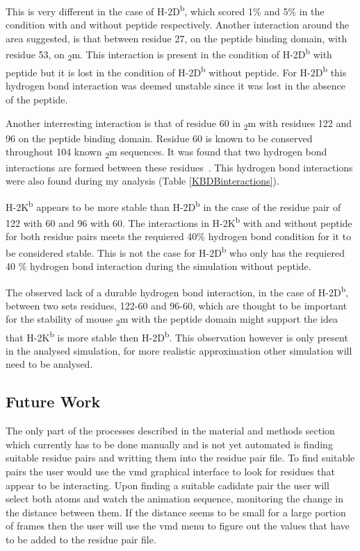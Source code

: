 \documentclass[11pt,twocolumn]{article}
\newcommand{\db}{H-2D\textsuperscript{b}\xspace}
\newcommand{\kb}{H-2K\textsuperscript{b}\xspace}
\newcommand{\btm}{\textbeta\textsubscript{2}m\xspace}
\begin{document}
This is very different in the case of \db, which scored 1\% and 5\% in the condition with and without peptide respectively. Another interaction around the area suggested, is that between  residue 27, on the peptide binding domain, with residue 53, on \btm. This interaction  is present in the condition of \db with peptide but it is lost in the condition of \db without peptide. For \db this hydrogen bond interaction was deemed unstable since it was lost in the absence of the peptide.  

Another interresting interaction is that of residue 60 in \btm with residues 122 and 96 on the peptide binding domain. Residue 60 is known to be conserved throughout 104 known \btm
sequences. It was found that two hydrogen bond interactions are formed between these residues~\cite{achour2006structural}. This hydrogen bond interactions were also found during my analysis (Table \ref{KBDBinteractions}). 

\kb appears to be more stable than \db in the case of the residue pair of 122 with 60 and 96 with 60. The  interactions in \kb with and without peptide for both residue pairs meets the requiered 40\% hydrogen bond condition for it to be considered stable. This is not the case for \db who only has the requiered 40 \% hydrogen bond interaction during the simulation without peptide.


The observed lack of a durable hydrogen bond interaction, in the case of \db, between two sets residues, 122-60 and 96-60, which are thought to be important for the stability of mouse \btm with the peptide domain might support the idea that \kb is more stable then \db. This observation however is only present in the analysed simulation, for more realistic approximation other simulation will need to be analysed.  

\subsection*{Future Work}

The only part of the processes described in the material and methods section which currently has to be done manually and is not yet automated is finding suitable residue pairs and writting them into the residue pair file. To find suitable pairs the user would use the vmd graphical interface to look for residues that appear to be interacting. Upon finding a suitable cadidate pair the user will select both atoms and watch the animation sequence, monitoring the change in the distance between them. If the distance seems to be small for a large portion of frames then the user will use the vmd menu to figure out the values that have to be added to the residue pair file.
\end{document}
